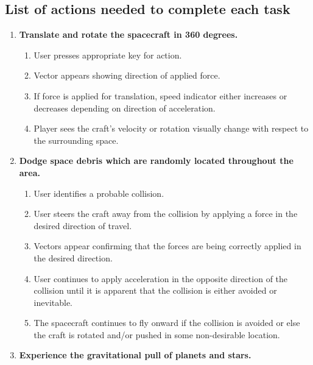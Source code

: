 \subsection{List of actions needed to complete each task}
\begin{enumerate}

\item\textbf{Translate and rotate the spacecraft in 360 degrees.}
\begin{enumerate}

  \item User presses appropriate key for action.

  \item Vector appears showing direction of applied force.

  \item If force is applied for translation, speed indicator either increases or decreases depending on direction of acceleration.

  \item Player sees the craft's velocity or rotation visually change with respect to the surrounding space.

\end{enumerate}

\item\textbf{Dodge space debris which are randomly located throughout the area.}
\begin{enumerate}

  \item User identifies a probable collision.

  \item User steers the craft away from the collision by applying a force in the desired direction of travel.

  \item Vectors appear confirming that the forces are being correctly applied in the desired direction.

  \item User continues to apply acceleration in the opposite direction of the collision until it is apparent that the collision is either avoided or inevitable.

  \item The spacecraft continues to fly onward if the collision is avoided or else the craft is rotated and/or pushed in some non-desirable location.

\end{enumerate}

\item\textbf{Experience the gravitational pull of planets and stars.}
\begin{enumerate}


\end{enumerate}
\end{enumerate}
